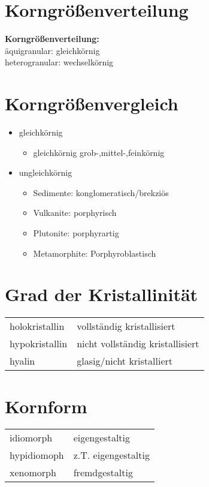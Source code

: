 \documentclass[a4, 12pt]{scrreprt}
\begin{document}
\section{Korngrößenverteilung}
\textbf{Korngrößenverteilung:}\\
äquigranular: gleichkörnig\\
heterogranular: wechselkörnig

\section{Korngrößenvergleich}

\begin{itemize}
\item gleichkörnig
\begin{itemize}
\item gleichkörnig grob-,mittel-,feinkörnig
\end{itemize}
\item ungleichkörnig
\begin{itemize}
\item Sedimente: konglomeratisch/brekziös
\item Vulkanite: porphyrisch
\item Plutonite: porphyrartig
\item Metamorphite: Porphyroblastisch
\end{itemize}
\end{itemize}

\section{Grad der Kristallinität}
\begin{center}
\begin{tabular}{ll}
holokristallin & vollständig kristallisiert\\
hypokristallin & nicht vollständig kristallisiert\\
hyalin & glasig/nicht kristalliert\\
\end{tabular}
\end{center}

\section{Kornform}

\begin{center}
\begin{tabular}{ll}
idiomorph & eigengestaltig\\
hypidiomoph & z.T. eigengestaltig\\
xenomorph & fremdgestaltig
\end{tabular}
\end{center}
\end{document}
